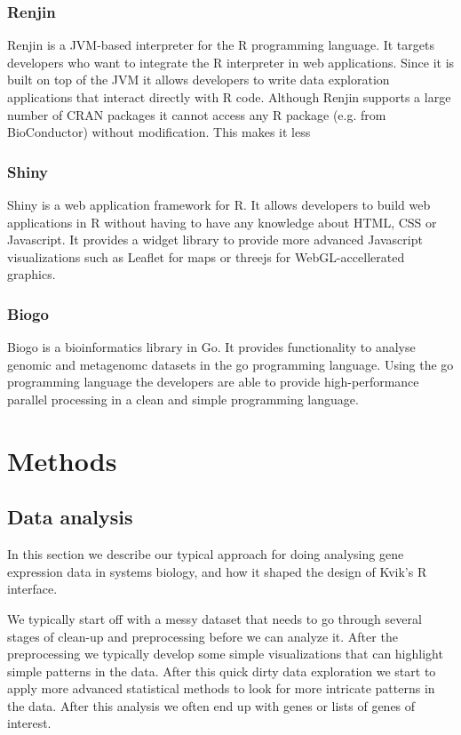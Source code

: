 \subsubsection*{Renjin} 
Renjin is a JVM-based interpreter for the R programming language.\cite{renjin}
It targets developers who want to integrate the R interpreter in web
applications.  Since it is built on top of the JVM it allows developers to write
data exploration applications that interact directly with R code. Although
Renjin supports a large number of CRAN packages it cannot access any R package
(e.g. from BioConductor) without modification. This makes it less 

\subsubsection*{Shiny} 
Shiny is a web application framework for R.\cite{shiny} It allows developers to
build web applications in R without having to have any knowledge about HTML, CSS
or Javascript. It provides a widget library to provide more advanced Javascript
visualizations such as Leaflet for maps or threejs for WebGL-accellerated
graphics. 

\subsubsection*{Biogo} 
Biogo is a bioinformatics library in Go. It provides functionality to analyse
genomic and metagenomc datasets in the go programming
language.\cite{Kortschak005033} Using the go programming language the developers
are able to provide high-performance parallel processing in a clean and simple
programming language. 


\section*{Methods} 
\subsection*{Data analysis} 
In this section we describe our typical approach for doing analysing gene
expression data in systems biology, and how it shaped the design of Kvik's
R interface. 

We typically start off with a messy dataset that needs to go through
several stages of clean-up and preprocessing before we can analyze it. After the
preprocessing we typically develop some simple visualizations that can highlight
simple patterns in the data. After this quick dirty data exploration we start to
apply more advanced statistical methods to look for more intricate patterns in
the data.  After this analysis we often end up with genes or lists of genes of
interest. 

